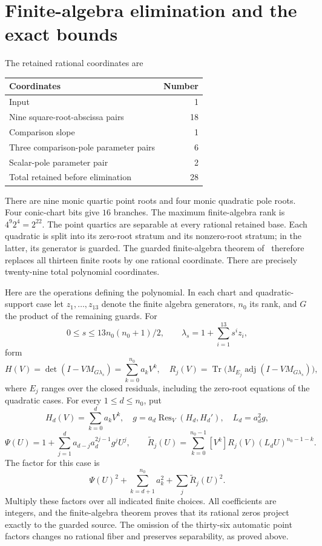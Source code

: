 \documentclass[11pt,a4paper]{article}
\begin{document}
\section{Finite-algebra elimination and the exact bounds}

The retained rational coordinates are
\begin{center}
\begin{tabular}{lr}
\toprule
Coordinates & Number\\
\midrule
Input & 1\\
Nine square-root-abscissa pairs & 18\\
Comparison slope & 1\\
Three comparison-pole parameter pairs & 6\\
Scalar-pole parameter pair & 2\\
\midrule
Total retained before elimination & 28\\
\bottomrule
\end{tabular}
\end{center}
There are nine monic quartic point roots and four monic
quadratic pole roots. Four conic-chart bits give $16$ branches.
The maximum finite-algebra rank is $4^9 2^4=2^{22}$.
The point quartics are separable at every rational retained
base. Each quadratic is split into its zero-root stratum and
its nonzero-root stratum; in the latter, its generator is guarded.
The guarded finite-algebra theorem of~\cite{Baseline} therefore
replaces all thirteen finite roots by one rational coordinate.
There are precisely twenty-nine total polynomial coordinates.

Here are the operations defining the polynomial. In each chart
and quadratic-support case let $z_1,\ldots,z_{13}$ denote the
finite algebra generators, $n_0$ its rank, and $G$ the product
of the remaining guards. For
\[
 0\le s\le13n_0(n_0+1)/2,
 \qquad\lambda_s=1+\sum_{i=1}^{13}s^i z_i,
\]
form
\[
 H(V)=\det(I-VM_{G\lambda_s})=\sum_{k=0}^{n_0}a_kV^k,
 \quad
 R_j(V)=\operatorname{Tr}\bigl(M_{E_j}\operatorname{adj}
                   (I-VM_{G\lambda_s})\bigr),
\]
where $E_j$ ranges over the closed residuals, including the
zero-root equations of the quadratic cases. For every
$1\le d\le n_0$, put
\[
 H_d(V)=\sum_{k=0}^d a_kV^k,\quad
 g=a_d\operatorname{Res}_V(H_d,H_d'),\quad L_d=a_d^2g,
\]
\[
 \Psi(U)=1+\sum_{j=1}^d a_{d-j}a_d^{2j-1}g^jU^j,
 \qquad
 \widetilde R_j(U)=\sum_{k=0}^{n_0-1}[V^k]R_j(V)
                                      (L_dU)^{n_0-1-k}.
\]
The factor for this case is
\[
            \Psi(U)^2+\sum_{k=d+1}^{n_0}a_k^2
                              +\sum_j\widetilde R_j(U)^2.
\]
Multiply these factors over all indicated finite choices. All
coefficients are integers, and the finite-algebra theorem proves
that its rational zeros project exactly to the guarded source.
The omission of the thirty-six automatic point factors changes
no rational fiber and preserves separability, as proved above.
\end{document}
